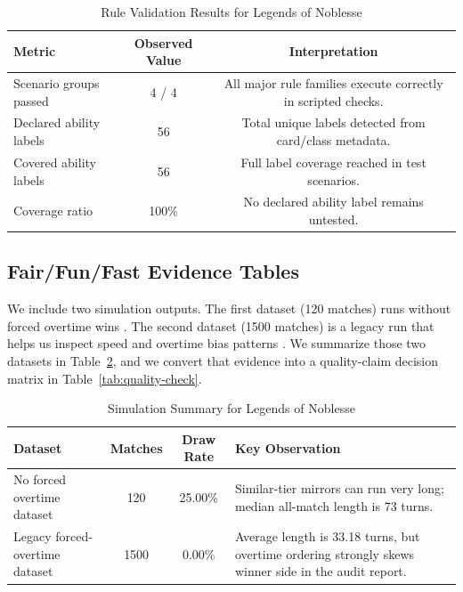 \documentclass[12pt]{article}
\newcommand{\GameName}{Legends of Noblesse}
\begin{document}
\begin{table}[H]
\centering
\caption{Rule Validation Results for \GameName}
\label{tab:ability-results}
\begin{tabular}{|l|c|c|}
\hline
\textbf{Metric} & \textbf{Observed Value} & \textbf{Interpretation} \\
\hline
Scenario groups passed & 4 / 4 & All major rule families execute correctly in scripted checks. \\
\hline
Declared ability labels & 56 & Total unique labels detected from card/class metadata. \\
\hline
Covered ability labels & 56 & Full label coverage reached in test scenarios. \\
\hline
Coverage ratio & 100\% & No declared ability label remains untested. \\
\hline
\end{tabular}
\end{table}

\subsection{Fair/Fun/Fast Evidence Tables}
We include two simulation outputs. The first dataset (120 matches) runs without forced overtime wins \cite{tier20summary,tier20strength}. The second dataset (1500 matches) is a legacy run that helps us inspect speed and overtime bias patterns \cite{tierlegacyraw,tier20report}.
We summarize those two datasets in Table~\ref{tab:sim-summary}, and we convert that evidence into a quality-claim decision matrix in Table~\ref{tab:quality-check}.

\begin{table}[H]
\centering
\caption{Simulation Summary for \GameName}
\label{tab:sim-summary}
\begin{tabular}{|p{4.7cm}|c|c|p{5.3cm}|}
\hline
\textbf{Dataset} & \textbf{Matches} & \textbf{Draw Rate} & \textbf{Key Observation} \\
\hline
No forced overtime dataset & 120 & 25.00\% & Similar-tier mirrors can run very long; median all-match length is 73 turns. \\
\hline
Legacy forced-overtime dataset & 1500 & 0.00\% & Average length is 33.18 turns, but overtime ordering strongly skews winner side in the audit report. \\
\hline
\end{tabular}
\end{table}
\end{document}
